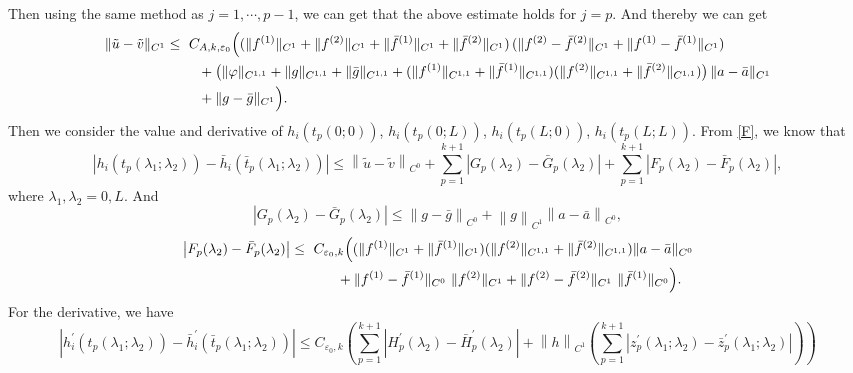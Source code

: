 \documentclass[a4paper,reqno,11pt]{amsart}
\numberwithin{equation}{section} %
\begin{document}
Then using the same method as $j=1,\cdots,p-1$, we can get that the above estimate holds for $j=p$. And thereby we can get
\[
\begin{aligned}
\|\tilde u-\tilde v\|_{C^{1}}
\le{}&\ C_{A,k,\varepsilon_0}\Bigl(
  (\|f^{(1)}\|_{C^{1}}+\|f^{(2)}\|_{C^{1}}
   +\|\bar f^{(1)}\|_{C^{1}}+\|\bar f^{(2)}\|_{C^{1}})\,
  (\|f^{(2)}-\bar f^{(2)}\|_{C^{1}}+\|f^{(1)}-\bar f^{(1)}\|_{C^{1}}) \\
&\quad + \bigl(\|\varphi\|_{C^{1,1}}+\|g\|_{C^{1,1}}+\|\bar g\|_{C^{1,1}}
   + (\|f^{(1)}\|_{C^{1,1}}+\|\bar f^{(1)}\|_{C^{1,1}})
     (\|f^{(2)}\|_{C^{1,1}}+\|\bar f^{(2)}\|_{C^{1,1}})\bigr)\,
     \|a-\bar a\|_{C^{1}} \\
&\quad + \|g-\bar g\|_{C^{1}}
\Bigr).
\end{aligned}
\]
Then we consider the value and derivative of $h_i(t_p(0;0))$, $h_i(t_p(0;L))$, $h_i(t_p(L;0))$, $h_i(t_p(L;L))$. From \eqref{F}, we know that
$$
\left| h_i\left( t_p\left( \lambda _1;\lambda _2 \right) \right) -\bar{h}_i\left( \bar{t}_p\left( \lambda _1;\lambda _2 \right) \right) \right|\leq \left\| \tilde{u}-\tilde{v} \right\| _{C^0}+\sum_{p=1}^{k+1}{\left| G_p\left( \lambda _2 \right) -\bar{G}_p\left( \lambda _2 \right) \right|}+\sum_{p=1}^{k+1}{\left| F_p\left( \lambda _2 \right) -\bar{F}_p\left( \lambda _2 \right) \right|},
$$
where $\lambda _1,\lambda _2=0,L$. And
$$
\left| G_p\left( \lambda _2 \right) -\bar{G}_p\left( \lambda _2 \right) \right|\le \left\| g-\bar{g} \right\| _{C^0}+\left\| g \right\| _{C^1}\left\| a-\bar{a} \right\| _{C^0},
$$
\[
\begin{aligned}
\bigl|F_p(\lambda_2)-\bar F_p(\lambda_2)\bigr|
\le{}&\ C_{\varepsilon_0,k}\Bigl(
  (\|f^{(1)}\|_{C^{1}}+\|\bar f^{(1)}\|_{C^{1}})
  (\|f^{(2)}\|_{C^{1,1}}+\|\bar f^{(2)}\|_{C^{1,1}})
  \|a-\bar a\|_{C^{0}} \\
&\qquad + \|f^{(1)}-\bar f^{(1)}\|_{C^{0}}\ \|f^{(2)}\|_{C^{1}}
  + \|f^{(2)}-\bar f^{(2)}\|_{C^{1}}\ \|\bar f^{(1)}\|_{C^{0}}
\Bigr).
\end{aligned}
\]
For the derivative, we have
$$
\left| h_{i}^{\prime}\left( t_p\left( \lambda _1;\lambda _2 \right) \right) -\bar{h}_{i}^{\prime}\left( \bar{t}_p\left( \lambda _1;\lambda _2 \right) \right) \right|\leq C_{\varepsilon _0,k}\left( \sum_{p=1}^{k+1}{\left| H_{p}^{\prime}\left( \lambda _2 \right) -\bar{H}_{p}^{\prime}\left( \lambda _2 \right) \right|}+\left\| h \right\| _{C^1}\left( \sum_{p=1}^{k+1}{\left| z_{p}^{\prime}\left( \lambda _1;\lambda _2 \right) -\bar{z}_{p}^{\prime}\left( \lambda _1;\lambda _2 \right) \right|} \right) \right) 
$$
\end{document}
